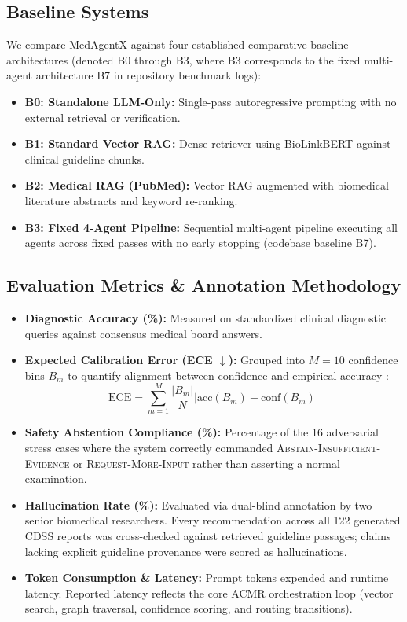 \documentclass[journal,10pt,twocolumn]{IEEEtran}
\begin{document}
\subsection{Baseline Systems}
We compare MedAgentX against four established comparative baseline architectures (denoted B0 through B3, where B3 corresponds to the fixed multi-agent architecture B7 in repository benchmark logs):
\begin{itemize}
    \item \textbf{B0: Standalone LLM-Only:} Single-pass autoregressive prompting with no external retrieval or verification.
    \item \textbf{B1: Standard Vector RAG:} Dense retriever using BioLinkBERT \cite{yasunaga2022biolinkbert} against clinical guideline chunks.
    \item \textbf{B2: Medical RAG (PubMed):} Vector RAG augmented with biomedical literature abstracts \cite{sayers2021pubmed,jin2019pubmedqa} and keyword re-ranking.
    \item \textbf{B3: Fixed 4-Agent Pipeline:} Sequential multi-agent pipeline executing all agents across fixed passes with no early stopping (codebase baseline B7).
\end{itemize}

\subsection{Evaluation Metrics \& Annotation Methodology}
\begin{itemize}
    \item \textbf{Diagnostic Accuracy (\%):} Measured on standardized clinical diagnostic queries against consensus medical board answers.
    \item \textbf{Expected Calibration Error (ECE $\downarrow$):} Grouped into $M=10$ confidence bins $B_m$ to quantify alignment between confidence and empirical accuracy \cite{guo2017calibration}:
    \begin{equation}
    \text{ECE} = \sum_{m=1}^{M} \frac{|B_m|}{N} \Big|\text{acc}(B_m) - \text{conf}(B_m)\Big|
    \end{equation}
    \item \textbf{Safety Abstention Compliance (\%):} Percentage of the 16 adversarial stress cases where the system correctly commanded \textsc{Abstain-Insufficient-Evidence} or \textsc{Request-More-Input} rather than asserting a normal examination.
    \item \textbf{Hallucination Rate (\%):} Evaluated via dual-blind annotation by two senior biomedical researchers. Every recommendation across all 122 generated CDSS reports was cross-checked against retrieved guideline passages; claims lacking explicit guideline provenance were scored as hallucinations.
    \item \textbf{Token Consumption \& Latency:} Prompt tokens expended and runtime latency. Reported latency reflects the core ACMR orchestration loop (vector search, graph traversal, confidence scoring, and routing transitions).
\end{itemize}
\end{document}
